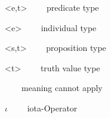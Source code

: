 \begin{styleStandard}
{\textless}e,t{\textgreater} \ \ \ \ predicate type
\end{styleStandard}

\begin{styleStandard}
{\textless}e{\textgreater} \ \ \ \ individual type
\end{styleStandard}

\begin{styleStandard}
{\textless}s,t{\textgreater} \ \ \ \ proposition type
\end{styleStandard}

\begin{styleStandard}
{\textless}t{\textgreater} \ \ \ \ truth value type
\end{styleStandard}

\begin{styleStandard}
[23CA?]\ \ \ \ meaning cannot apply
\end{styleStandard}

\begin{styleStandard}
$\iota $ \ \ \ \ iota-Operator
\end{styleStandard}

